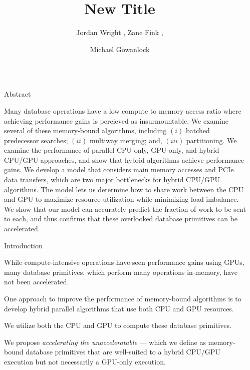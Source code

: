 \documentclass[final]{beamer}
\title{New Title}
\author{Jordan Wright \inst{1}, Zane Fink \inst{1}, \and Michael Gowanlock\inst{1}}
\institute[shortinst]{\inst{1} School of Informatics, Computing, and Cyber Systems at Northern Arizona University}
\newlength{\sepwidth}
\newlength{\colwidth}
\newcommand{\separatorcolumn}{\begin{column}{\sepwidth}\end{column}}
\begin{document}
\begin{frame}[t]
\begin{columns}[t]
\separatorcolumn

\begin{column}{\colwidth}

  \begin{block}{Abstract}

   Many database operations have a low compute to memory access ratio where achieving performance gains is percieved as insurmountable. We examine several of these memory-bound algorithms, 
   including $(i)$ batched predecessor searches; $(ii)$ multiway merging; and, $(iii)$ partitioning. 
   We examine the performance of parallel CPU-only, GPU-only, and hybrid CPU/GPU approaches, and show 
   that hybrid algorithms achieve performance gains. We develop a model that considers 
   main memory accesses and PCIe data transfers, which are two major bottlenecks for hybrid CPU/GPU algorithms. 
   The model lets us determine how to share work between the CPU and GPU to maximize resource 
   utilization while minimizing load imbalance. We show that our model can accurately predict the fraction of work 
   to be sent to each, and thus confirms that these overlooked database primitives can be 
   accelerated. 

  \end{block}

  \begin{block}{Introduction}
    
\begin{description}[font=$\bullet$~\normalfont\scshape\color{red!50!black}]

\item While compute-intensive operations have seen performance gains using GPUs, many database primitives, which perform many operations in-memory, have not been accelerated. 

\item One approach to improve the performance of memory-bound algorithms is to develop hybrid parallel algorithms that use both CPU and GPU resources.

\item We utilize both the CPU and GPU to compute these database primitives.

\item We propose \emph{accelerating the unacceleratable} --- which we define as memory-bound database primitives that are well-suited to a hybrid CPU/GPU execution but not necessarily a GPU-only execution. 


\end{description}
\end{block}
\end{column}
\end{columns}
\end{frame}
\end{document}
